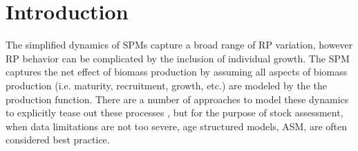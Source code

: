 %
\newcommand{\kr}{ \frac{\kappa w_\infty}{w(a_s)} }
\newcommand{\one}{
        \left(\frac{Z(Z+\kappa)}{\alpha w(a_s)(Z+\kr)}\right)^\gamma
}
\newcommand{\two}{
        \left(\frac{\gamma F}{\alpha w(a_s)}\right) \left(\frac{Z(Z+\kappa)}{\alpha w(a_s)(Z+\kr)}\right)^{\gamma-1}
}
\newcommand{\thr}{
        \frac{\left(\kr\right)\left(\kappa-\kr\right)}{(Z+\kr)^2}
}
%
\newcommand{\oneA}{
        \left(\frac{Z^*(Z^*+\kappa)}{w(a_s)(Z^*+\kr)}\right)^\gamma
}
\newcommand{\twoA}{
        \left(\frac{\gamma F^*}{w(a_s)}\right) \left(\frac{Z^*(Z^*+\kappa)}{w(a_s)(Z^*+\kr)}\right)^{\gamma-1}
}
\newcommand{\thrA}{
        \frac{\left(\kr\right)\left(\kappa-\kr\right)}{(Z^*+\kr)^2}
}




%
\section{Introduction}

%
The simplified dynamics of SPMs capture a broad range of RP variation, however
RP behavior can be complicated by the inclusion of individual growth. %
The SPM captures the net effect of biomass production by assuming all aspects 
of biomass production (i.e. maturity, recruitment, growth, etc.) are modeled by the %
the production function. There are a number of %
approaches to model these dynamics to explicitly tease out these processes \cite{quinn_quantitative_1999, hilborn_quantitative_1992}, 
but for the purpose of stock assessment, when data limitations are not too severe, %
age structured models, ASM, \cite{methot_stock_2013} are often considered best practice.

